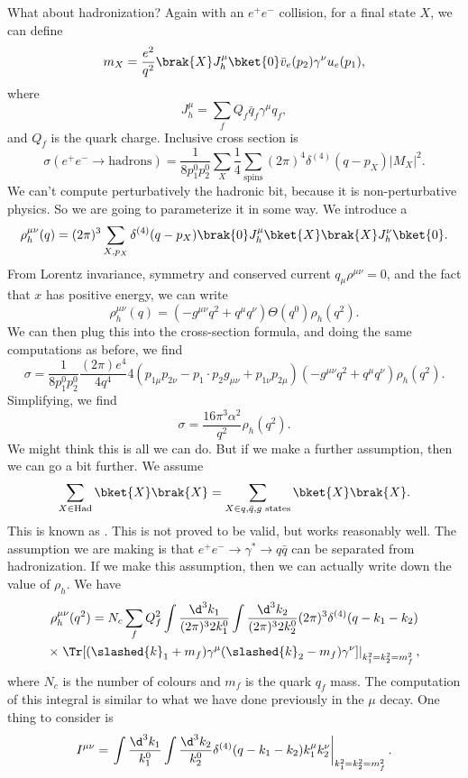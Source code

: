 \documentclass[a4paper]{article}
\begin{document}
What about hadronization? Again with an $e^+e^-$ collision, for a final state $X$, we can define
\[
  m_X = \frac{e^2}{q^2} \brak{X} J^\mu_h \bket{0} \bar{v}_e (p_2) \gamma^\nu u_e(p_1),
\]
where
\[
  J^\mu_h = \sum_f Q_f \bar{q}_f \gamma^\mu q_f,
\]
and $Q_f$ is the quark charge. Inclusive cross section is
\[
  \sigma(e^+ e^- \to \mathrm{hadrons}) = \frac{1}{8p_1^0 p_2^0} \sum_{X} \frac{1}{4} \sum_{\mathrm{spins}} (2\pi)^4 \delta^{(4)} (q - p_X) |M_X|^2.
\]
We can't compute perturbatively the hadronic bit, because it is non-perturbative physics. So we are going to parameterize it in some way. We introduce a 
\[
  \rho_h^{\mu\nu} (q) = (2\pi)^3 \sum_{X, p_X} \delta^{(4)} (q - p_X) \brak{0}J_h^\mu\bket{X} \brak{X}J_h^\nu\bket{0}.
\]
From Lorentz invariance, symmetry and conserved current $q_\mu \rho^{\mu\nu} = 0$, and the fact that $x$ has positive energy, we can write
\[
  \rho_h^{\mu\nu}(q) = (- g^{\mu\nu} q^2 + q^\mu q^\nu) \Theta(q^0) \rho_h (q^2).
\]
We can then plug this into the cross-section formula, and doing the same computations as before, we find
\[
  \sigma = \frac{1}{8 p_1^0 p_2^0} \frac{(2\pi) e^4}{4 q^4} 4 (p_{1\mu} p_{2\nu} - p_1 \cdot p_2 g_{\mu\nu} + p_{1\nu} p_{2\mu})(-g^{\mu\nu} q^2 + q^\mu q^\nu) \rho_h(q^2).
\]
Simplifying, we find
\[
  \sigma = \frac{16 \pi^3 \alpha^2}{q^2} \rho_h(q^2).
\]
We might think this is all we can do. But if we make a further assumption, then we can go a bit further. We assume
\[
  \sum_{X \in \mathrm{Had}}\bket{X}\brak{X} = \sum_{X \in q, \bar{q}, g\text{ states}} \bket{X}\brak{X}.
\]
This is known as . This is not proved to be valid, but works reasonably well. The assumption we are making is that $e^+ e^- \to \gamma^* \to q\bar{q}$ can be separated from hadronization. If we make this assumption, then we can actually write down the value of $\rho_h$. We have
\begin{multline*}
  \rho_h^{\mu\nu}(q^2) = N_c \sum_f Q_f^2 \int \frac{\d^3 k_1}{(2\pi)^3 2 k_1^0} \int \frac{\d^3 k_2}{(2\pi)^3 2k_2^0} (2\pi)^3 \delta^{(4)}(q - k_1 - k_2)\\
  \times \left.\Tr [(\slashed{k}_1 + m_f) \gamma^\mu (\slashed{k}_2 - m_f) \gamma^{\nu}]\right|_{k_1^2 = k_2^2 = m_f^2}, %
\end{multline*}
where $N_c$ is the number of colours and $m_f$ is the quark $q_f$ mass. The computation of this integral is similar to what we have done previously in the $\mu$ decay. One thing to consider is
\[
  I^{\mu\nu} = \left.\int \frac{\d^3 k_1}{k_1^0} \int \frac{\d^3 k_2}{k_2^0} \delta^{(4)}(q - k_1 - k_2) k_1^\mu k_2^\nu\right|_{k_1^2 = k_2^2 = m_f^2}.
\]
\end{document}

